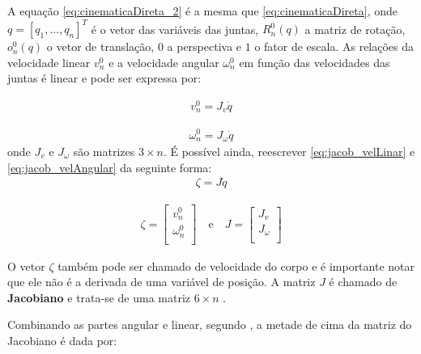 A equação \eqref{eq:cinematicaDireta_2} é a mesma que \eqref{eq:cinematicaDireta}, onde $q = [q_1,...,q_n]^T$ é o vetor das 
variáveis das juntas, $R^{0}_n(q)$ a matriz de rotação, $o^{0}_n(q)$ o vetor de translação, $0$ a perspectiva e $1$ o 
fator de escala. As relações da velocidade linear $v^0_n$ e a velocidade angular $\omega^0_n$ em função das velocidades 
das juntas é linear \cite{siciliano} e pode ser expressa por:

\begin{equation}
  \begin{gathered}
    v^0_n = J_v \dot{q}
  \end{gathered}
  \label{eq:jacob_velLinar}
\end{equation}

\begin{equation}
  \begin{gathered}
    \omega^0_n = J_\omega \dot{q}
  \end{gathered}
  \label{eq:jacob_velAngular}
\end{equation}
onde $J_v$ e $J_\omega$ são matrizes $3 \times n$. É possível ainda, reescrever \eqref{eq:jacob_velLinar} e
\eqref{eq:jacob_velAngular} da seguinte forma:
\begin{equation}
  \begin{gathered}
    \zeta = J\dot{q}
  \end{gathered}
  \label{eq:jacob_ambos}
\end{equation}

\begin{equation}
  \begin{gathered}
    \zeta = \begin{bmatrix}
     v^0_n\\
     \omega^0_n\\
    \end{bmatrix}
    \quad \textrm{e} \quad 
    J = \begin{bmatrix}
     J_v\\
     J_\omega\\
    \end{bmatrix}
  \end{gathered}
\end{equation}

O vetor $\zeta$ também pode ser chamado de velocidade do corpo \cite{Spong} e é importante notar que
ele não é a derivada de uma variável de posição. A matriz $J$ é chamado de \textbf{Jacobiano} e trata-se
de uma matriz $6 \times n$ .

Combinando as partes angular e linear, segundo , a metade de cima da matriz do Jacobiano é
dada por:

